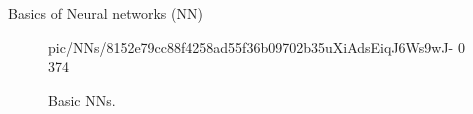 \documentclass{beamer}
\begin{document}

    
     \begin{frame}{Basics of Neural networks (NN)}
        \begin{figure}
            \centering
            {pic/NNs/8152e79cc88f4258ad55f36b09702b35uXiAdsEiqJ6Ws9wJ-} %
            {0} %
            {374} %
            \caption{Basic NNs.}%
            \label{fig:basic_nns}
        \end{figure}
    \end{frame}
\end{document}
